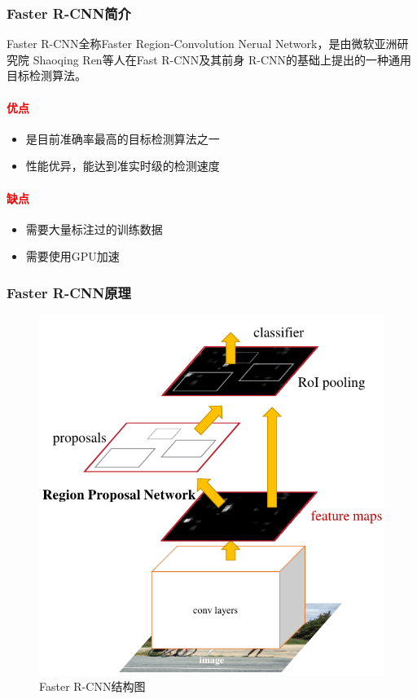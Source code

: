 \documentclass[UTF8]{beamer}
\begin{document}
\begin{frame}
  \frametitle{Faster R-CNN简介}
  Faster R-CNN全称Faster Region-Convolution Nerual Network，是由微软亚洲研究院
  Shaoqing Ren\cite{Ren:2015ug}等人在Fast R-CNN\cite{Girshick:2015ib}及其前身
  R-CNN\cite{Girshick:2014jx}的基础上提出的一种通用目标检测算法。
  
  \textcolor{red}{\paragraph{优点}}
  \begin{itemize}
    \item 是目前准确率最高的目标检测算法之一
    \item 性能优异，能达到准实时级的检测速度
  \end{itemize} 

  \textcolor{red}{\paragraph{缺点}}
  \begin{itemize}
    \item 需要大量标注过的训练数据
    \item 需要使用GPU加速
  \end{itemize}
\end{frame}

\begin{frame}
  \frametitle{Faster R-CNN原理}
  
  \begin{figure}[ht]
    \centering
    \includegraphics[height=0.8\textheight]{./Figure/FasterRCNN.png}
    \caption{Faster R-CNN结构图}\label{Fig:FasterRCNN}
  \end{figure}
\end{frame}
\end{document}
